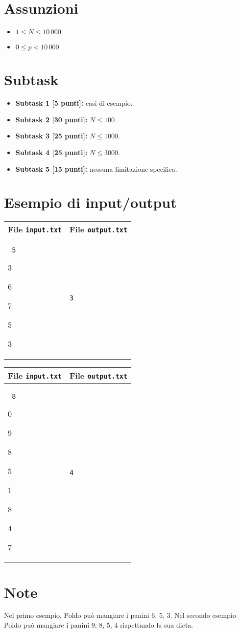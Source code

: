 \documentclass[a4paper,11pt]{article}
\newcommand{\file}[1]{\texttt{#1}}
\newcommand{\esempio}[2]{
\noindent\begin{minipage}{\textwidth}
\begin{tabular}{|p{11cm}|p{5cm}|}
	\hline
	\textbf{File \file{input.txt}} & \textbf{File \file{output.txt}}\\
	\hline
	\tt \small #1 &
	\tt \small #2 \\
	\hline
\end{tabular}
\end{minipage}
}
\begin{document}
\section*{Assunzioni}

\begin{itemize}
\item $1 \le N \le 10\,000$
\item $0 \le p < 10\,000$
\end{itemize}

\section*{Subtask}
\begin{itemize}
\item \textbf{Subtask 1 [\phantom{1}5 punti]:} casi di esempio.
\item \textbf{Subtask 2 [30 punti]:} $N \le 100$.
\item \textbf{Subtask 3 [25 punti]:} $N \le 1000$.
\item \textbf{Subtask 4 [25 punti]:} $N \le 3000$.
\item \textbf{Subtask 5 [15 punti]:} nessuna limitazione specifica.
\end{itemize}

\section*{Esempio di input/output}
\esempio{
5

3

6

7

5

3
}{3}

\esempio{
8

0

9

8

5

1

8

4

7
}{4}

\section*{Note}
Nel primo esempio, Poldo può mangiare i panini 6, 5, 3. Nel secondo esempio Poldo può mangiare i panini 9, 8, 5, 4 rispettando la sua dieta.
\end{document}
